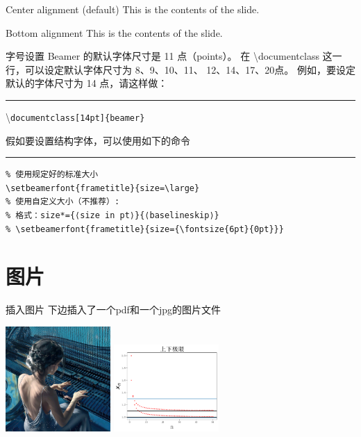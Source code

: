 \documentclass[10pt]{beamer}
\begin{document}
\begin{frame}[c]{Center alignment (default)} %
  This is the contents of the slide. 
\end{frame} 

\begin{frame}[b]{Bottom alignment} 
  This is the contents of the slide. 
\end{frame} 

\begin{frame}[fragile]{字号设置}
  Beamer 的默认字体尺寸是 11 点（points）。 
  在 \textbackslash documentclass 这一行，可以设定默认字体尺寸为 
  8、9、10、11、 12、14、17、20点。
  例如，要设定默认的字体尺寸为 14 点，请这样做：
  \rule{0.6\linewidth}{1pt}
  \textbackslash \texttt{documentclass[14pt]\{beamer\}}
  \vspace*{3em}

  假如要设置结构字体，可以使用如下的命令
  \rule{0.6\linewidth}{1pt}
  \begin{Verbatim}
% 使用规定好的标准大小
\setbeamerfont{frametitle}{size=\large}
% 使用自定义大小（不推荐）:
% 格式：size*={⟨size in pt⟩}{⟨baselineskip⟩}
% \setbeamerfont{frametitle}{size={\fontsize{6pt}{0pt}}}
  \end{Verbatim}
\end{frame}


\section{图片}
\begin{frame}{插入图片}
  下边插入了一个pdf和一个jpg的图片文件
  \begin{center} 
    \includegraphics[width=0.3\textwidth]{../Pic/cover.jpg} 
    \includegraphics[width=0.3\textwidth]{../Pic/上下极限散点图.pdf} 
  \end{center}  
\end{frame}
\end{document}
